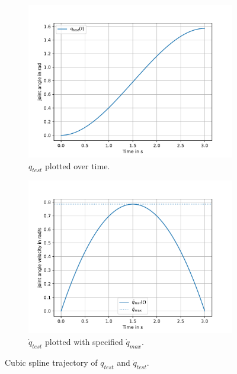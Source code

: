 \begin{figure}[H]
    \centering
    \begin{subfigure}[t]{0.48\textwidth}
        \centering
        \includegraphics[width=\textwidth]{SRC/SplineExampleAngle.pdf} %
        \caption{ $q_{test}$ plotted over time.}
        \label{fig:subfig1}
    \end{subfigure}
    \hfill
    \begin{subfigure}[t]{0.48\textwidth}
        \centering
        \includegraphics[width=\textwidth]{SRC/SplineExampleVelocity.pdf} %
        \caption{$\dot{q}_{test}$ plotted with specified $\dot{q}_{max}$.}
        \label{fig:subfig2}
    \end{subfigure}
    
    \caption{Cubic spline trajectory of $q_{test}$ and $\dot{q}_{test}$.}
    \label{fig:SplineExample}
\end{figure}


